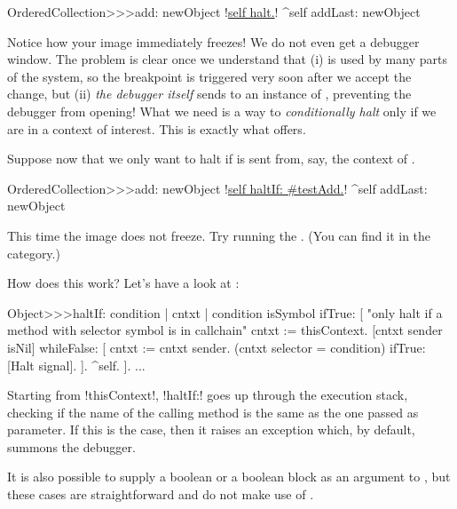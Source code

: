 \documentclass[a4paper,10pt,twoside]{book}
\begin{document}
\begin{code}{}
OrderedCollection>>>add: newObject
        !\underline{self halt.}!
        ^self addLast: newObject
\end{code}

Notice how your image immediately freezes!  We do not even get a debugger window.
The problem is clear once we understand that (i)  is used by many parts of the system, so the breakpoint is triggered very soon after we accept the change, but (ii) \emph{the debugger itself} sends  to an instance of , preventing the debugger from opening!
What we need is a way to \emph{conditionally halt} only if we are in a context of interest.
This is exactly what  offers.

Suppose now that we only want to halt if  is sent from, say, the context of .

\begin{code}{}
OrderedCollection>>>add: newObject
        !\underline{self haltIf: \#testAdd.}!
        ^self addLast: newObject
\end{code}

This time the image does not freeze. Try running the .
(You can find it in the  category.)

How does this work?  Let's have a look at :
\begin{code}{}
Object>>>haltIf: condition
        | cntxt |
        condition isSymbol ifTrue: [
                "only halt if a method with selector symbol is in callchain"
                cntxt := thisContext.
                [cntxt sender isNil] whileFalse: [
                        cntxt := cntxt sender.
                        (cntxt selector = condition) ifTrue: [Halt signal]. ].
                ^self.
        ].
        ...
\end{code}

Starting from \ct!thisContext!, \ct!haltIf:! goes up through the execution stack, checking if the name of the calling method is the same as the one passed as parameter.
If this is the case, then it raises an exception which, by default, summons the debugger.

It is also possible to supply a boolean or a boolean block as an argument to , but these cases are straightforward and do not make use of .
\end{document}

